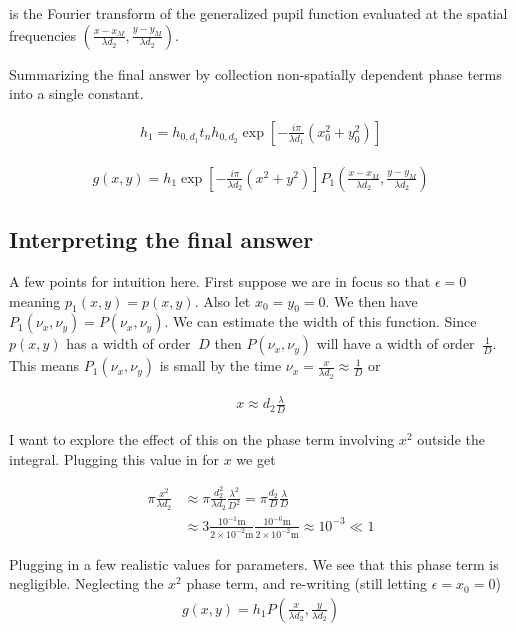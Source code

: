 \documentclass[12pt]{article}
\begin{document}
is the Fourier transform of the generalized pupil function evaluated at the spatial frequencies $\left(\frac{x-x_M}{\lambda d_2}, \frac{y-y_M}{\lambda d_2}\right)$.

Summarizing the final answer by collection non-spatially dependent phase terms into a single constant.

\begin{align}
h_1 = h_{0,d_1} t_n h_{0,d_2} \exp\left[-\frac{i\pi}{\lambda d_1}(x_0^2+y_0^2)\right]
\end{align}


\begin{align}
g(x,y) = h_1 \exp\left[-\frac{i\pi}{\lambda d_2}(x^2+y^2)\right] P_1\left(\frac{x-x_M}{\lambda d_2}, \frac{y-y_M}{\lambda d_2}\right)
\end{align}

\subsection{Interpreting the final answer}

A few points for intuition here. First suppose we are in focus so that $\epsilon = 0$ meaning $p_1(x,y) = p(x,y)$. Also let $x_0 = y_0 = 0$. We then have $P_1(\nu_x,\nu_y) = P(\nu_x,\nu_y)$. We can estimate the width of this function. Since $p(x,y)$ has a width of order $~D$ then $P(\nu_x,\nu_y)$ will have a width of order $~\frac{1}{D}$. This means $P_1(\nu_x,\nu_y)$ is small by the time $\nu_x = \frac{x}{\lambda d_2} \approx \frac{1}{D}$ or

\begin{align}
x \approx d_2 \frac{\lambda}{D}
\end{align}

I want to explore the effect of this on the phase term involving $x^2$ outside the integral. Plugging this value in for $x$ we get

\begin{align}
\pi \frac{x^2}{\lambda d_2} &\approx \pi \frac{d_2^2}{\lambda d_2} \frac{\lambda^2}{D^2} = \pi \frac{d_2}{D}\frac{\lambda}{D}\\
&\approx 3 \frac{10^{-1} \text{m}}{2 \times 10^{-2}\text{m}} \frac{10^{-6}\text{m}}{2 \times 10^{-2}\text{m}} \approx 10^{-3} \ll 1
\end{align}

Plugging in a few realistic values for parameters. We see that this phase term is negligible. Neglecting the $x^2$ phase term, and re-writing (still letting $\epsilon = x_0 = 0$)
\begin{align}
g(x,y) = h_1 P\left(\frac{x}{\lambda d_2}, \frac{y}{\lambda d_2}\right)
\end{align}
\end{document}
